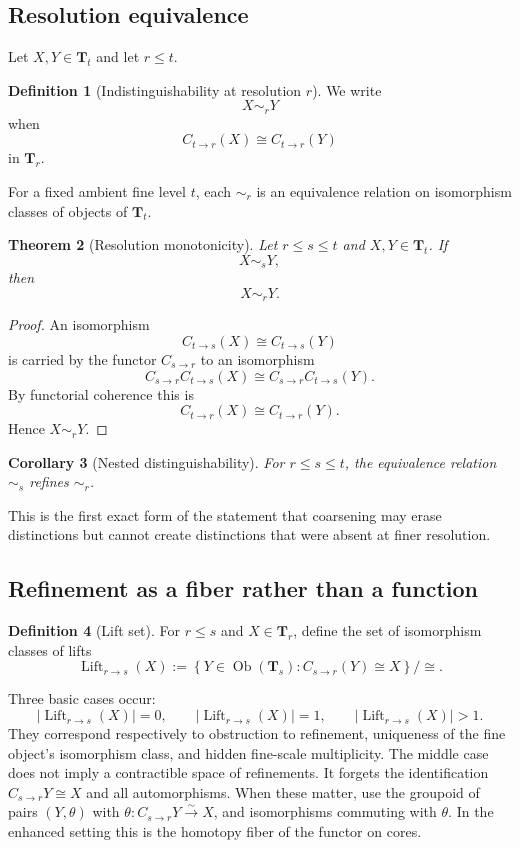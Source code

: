 \documentclass[11pt]{article}
\newtheorem{theorem}{Theorem}[section]
\newtheorem{corollary}[theorem]{Corollary}
\theoremstyle{definition}
\newtheorem{definition}[theorem]{Definition}
\theoremstyle{remark}
\newcommand{\Tcat}{\mathbf T}
\newcommand{\Ob}{\operatorname{Ob}}
\newcommand{\Lift}{\operatorname{Lift}}
\begin{document}
\subsection{Resolution equivalence}

Let $X,Y\in\Tcat_t$ and let $r\le t$.

\begin{definition}[Indistinguishability at resolution $r$]
We write
\[
X\sim_r Y
\]
when
\[
C_{t\to r}(X)\cong C_{t\to r}(Y)
\]
in $\Tcat_r$.
\end{definition}

For a fixed ambient fine level $t$, each $\sim_r$ is an equivalence relation on isomorphism classes of objects of $\Tcat_t$.

\begin{theorem}[Resolution monotonicity]\label{thm:resolution-monotonicity}
Let $r\le s\le t$ and $X,Y\in\Tcat_t$. If
\[
X\sim_sY,
\]
then
\[
X\sim_rY.
\]
\end{theorem}

\begin{proof}
An isomorphism
\[
C_{t\to s}(X)\cong C_{t\to s}(Y)
\]
is carried by the functor $C_{s\to r}$ to an isomorphism
\[
C_{s\to r}C_{t\to s}(X)
\cong
C_{s\to r}C_{t\to s}(Y).
\]
By functorial coherence this is
\[
C_{t\to r}(X)\cong C_{t\to r}(Y).
\]
Hence $X\sim_rY$.
\end{proof}

\begin{corollary}[Nested distinguishability]\label{cor:nested}
For $r\le s\le t$, the equivalence relation $\sim_s$ refines $\sim_r$.
\end{corollary}

This is the first exact form of the statement that coarsening may erase distinctions but cannot create distinctions that were absent at finer resolution.

\subsection{Refinement as a fiber rather than a function}

\begin{definition}[Lift set]
For $r\le s$ and $X\in\Tcat_r$, define the set of isomorphism classes of lifts
\[
\Lift_{r\to s}(X)
:=
\left\{
Y\in\Ob(\Tcat_s):C_{s\to r}(Y)\cong X
\right\}/\cong.
\]
\end{definition}

Three basic cases occur:
\[
|\Lift_{r\to s}(X)|=0,
\qquad
|\Lift_{r\to s}(X)|=1,
\qquad
|\Lift_{r\to s}(X)|>1.
\]
They correspond respectively to obstruction to refinement, uniqueness of the fine object's isomorphism class, and hidden fine-scale multiplicity. The middle case does not imply a contractible space of refinements. It forgets the identification $C_{s\to r}Y\cong X$ and all automorphisms. When these matter, use the groupoid of pairs $(Y,\theta)$ with $\theta:C_{s\to r}Y\xrightarrow{\sim}X$, and isomorphisms commuting with $\theta$. In the enhanced setting this is the homotopy fiber of the functor on cores.
\end{document}
